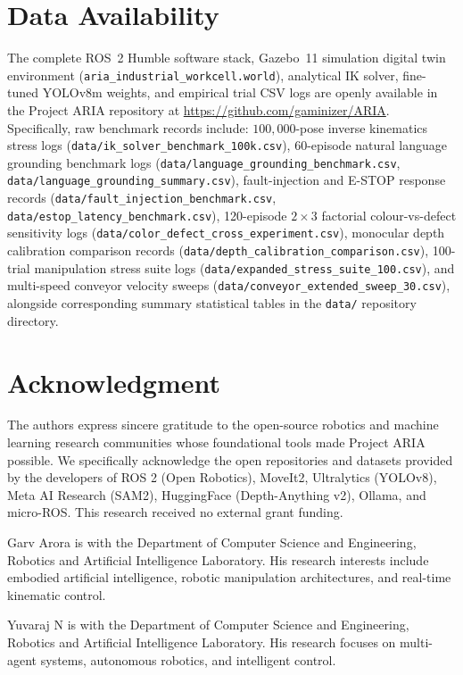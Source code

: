 \documentclass[journal]{IEEEtran}
\begin{document}
\section*{Data Availability}
The complete ROS~2 Humble software stack, Gazebo~11 simulation digital twin environment (\texttt{aria\_industrial\_workcell.world}), analytical IK solver, fine-tuned YOLOv8m weights, and empirical trial CSV logs are openly available in the Project ARIA repository at \url{https://github.com/gaminizer/ARIA}. Specifically, raw benchmark records include: $100{,}000$-pose inverse kinematics stress logs (\texttt{data/ik\_solver\_benchmark\_100k.csv}), 60-episode natural language grounding benchmark logs (\texttt{data/language\_grounding\_benchmark.csv}, \texttt{data/language\_grounding\_summary.csv}), fault-injection and E-STOP response records (\texttt{data/fault\_injection\_benchmark.csv}, \texttt{data/estop\_latency\_benchmark.csv}), 120-episode $2 \times 3$ factorial colour-vs-defect sensitivity logs (\texttt{data/color\_defect\_cross\_experiment.csv}), monocular depth calibration comparison records (\texttt{data/depth\_calibration\_comparison.csv}), 100-trial manipulation stress suite logs (\texttt{data/expanded\_stress\_suite\_100.csv}), and multi-speed conveyor velocity sweeps (\texttt{data/conveyor\_extended\_sweep\_30.csv}), alongside corresponding summary statistical tables in the \texttt{data/} repository directory.

\section*{Acknowledgment}
The authors express sincere gratitude to the open-source robotics and machine learning research communities whose foundational tools made Project ARIA possible. We specifically acknowledge the open repositories and datasets provided by the developers of ROS 2 (Open Robotics), MoveIt2, Ultralytics (YOLOv8), Meta AI Research (SAM2), HuggingFace (Depth-Anything v2), Ollama, and micro-ROS. This research received no external grant funding.

\def\IEEEbibitemsep{-1.2pt}



\begin{IEEEbiographynophoto}{Garv Arora}
is with the Department of Computer Science and Engineering, Robotics and Artificial Intelligence Laboratory. His research interests include embodied artificial intelligence, robotic manipulation architectures, and real-time kinematic control.
\end{IEEEbiographynophoto}

\begin{IEEEbiographynophoto}{Yuvaraj N}
is with the Department of Computer Science and Engineering, Robotics and Artificial Intelligence Laboratory. His research focuses on multi-agent systems, autonomous robotics, and intelligent control.
\end{IEEEbiographynophoto}
\end{document}
